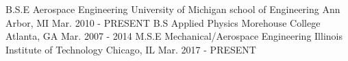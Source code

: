 \begin{cventries}
\cventry
{B.S.E Aerospace Engineering} %
{University of Michigan school of Engineering} %
{Ann Arbor, MI} %
{Mar. 2010 - PRESENT} %
{ }
\vspace{-3mm}
\cventry
{B.S Applied Physics} %
{Morehouse College}  %
{Atlanta, GA} %
{Mar. 2007 - 2014} %
{ }
\vspace{-3mm}
\cventry
{M.S.E Mechanical/Aerospace Engineering} %
{Illinois Institute of Technology}  %
{Chicago, IL} %
{Mar. 2017 - PRESENT} %
{ }
\vspace{-3mm}
\end{cventries}